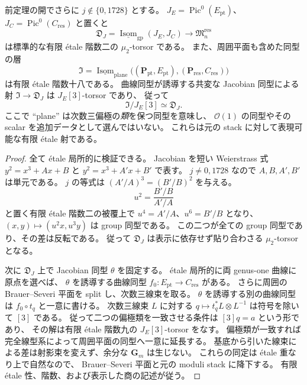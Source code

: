 \begin{proposition}
\label{prop:nfm-point-residual-isom-cover}
前定理の開でさらに $j\notin\{0,1728\}$ とする。
$J_E=\operatorname{Pic}^0(E_{\mathrm{pt}})$、
$J_C=\operatorname{Pic}^0(C_{\mathrm{res}})$ と置くと
\[
 \mathfrak D_J=\underline{\operatorname{Isom}}_{\mathrm{gp}}(J_E,J_C)
       \longrightarrow\mathfrak M_n^{\mathrm{res}}
\]
は標準的な有限 étale 階数二の $\mu_2$-torsor である。
また、周囲平面も含めた同型の層
\[
 \mathfrak I=\underline{\operatorname{Isom}}_{\mathrm{plane}}
  \bigl((\mathbf P_{\mathrm{pt}},E_{\mathrm{pt}}),
        (\mathbf P_{\mathrm{res}},C_{\mathrm{res}})\bigr)
\]
は有限 étale 階数十八である。
曲線同型が誘導する共変な Jacobian 同型による射
$\mathfrak I\to\mathfrak D_J$ は $J_E[3]$-torsor であり、
従って
\[
 \mathfrak I/J_E[3]\simeq\mathfrak D_J.
\]
ここで ``plane'' は次数三偏極の\emph{類}を保つ同型を意味し、
$\mathcal O(1)$ の同型やその scalar を追加データとして選んではいない。
これらは元の stack に対して表現可能な有限 étale 射である。
\end{proposition}

\begin{proof}
全て étale 局所的に検証できる。
Jacobian を短い Weierstrass 式
$y^2=x^3+Ax+B$ と $y^2=x^3+A'x+B'$ で表す。
$j\ne0,1728$ なので $A,B,A',B'$ は単元である。
$j$ の等式は
$(A'/A)^3=(B'/B)^2$ を与える。
\[
 u^2=\frac{B'/B}{A'/A}
\]
と置く有限 étale 階数二の被覆上で
$u^4=A'/A$、$u^6=B'/B$ となり、
$(x,y)\mapsto(u^2x,u^3y)$ は group 同型である。
この二つが全ての group 同型であり、その差は反転である。
従って $\mathfrak D_J$ は表示に依存せず貼り合わさる $\mu_2$-torsor となる。

次に $\mathfrak D_J$ 上で Jacobian 同型 $\theta$ を固定する。
étale 局所的に両 genus-one 曲線に原点を選べば、
$\theta$ を誘導する曲線同型 $f_0:E_{\mathrm{pt}}\to C_{\mathrm{res}}$ がある。
さらに周囲の Brauer--Severi 平面を split し、次数三線束を取る。
$\theta$ を誘導する別の曲線同型は $f_0\circ t_q$ と一意に書ける。
次数三線束 $L$ に対する
$q\mapsto t_q^*L\otimes L^{-1}$ は符号を除いて $[3]$ である。
従って二つの偏極類を一致させる条件は $[3]q=a$ という形であり、
その解は有限 étale 階数九の $J_E[3]$-torsor をなす。
偏極類が一致すれば完全線型系によって周囲平面の同型へ一意に延長する。
基底から引いた線束による差は射影束を変えず、余分な $\mathbf G_m$ は生じない。
これらの同定は étale 重なり上で自然なので、
Brauer--Severi 平面と元の moduli stack に降下する。
有限 étale 性、階数、および表示した商の記述が従う。
\end{proof}

